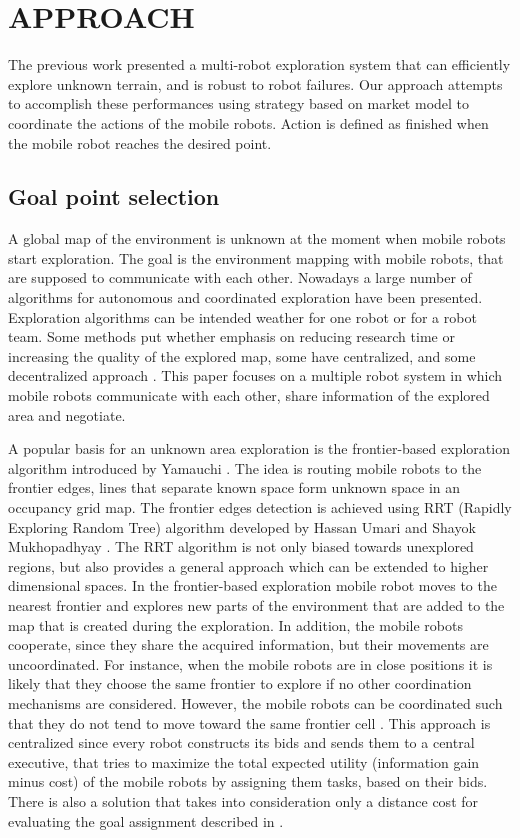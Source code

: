 \documentclass[letterpaper, 10 pt, conference]{ieeeconf}  %
\begin{document}
\section{APPROACH}
The previous work presented a multi-robot exploration system that can efficiently explore unknown terrain, and is robust to robot failures. Our approach attempts to accomplish these performances using strategy based on market model to coordinate the actions of the mobile robots. Action is defined as finished when the mobile robot reaches the desired point.  

\subsection{Goal point selection}
A global map of the environment is unknown at the moment when mobile robots start exploration. The goal is the environment mapping with mobile robots, that are supposed to communicate with each other. 
Nowadays a large number of algorithms for autonomous and coordinated exploration have been presented. Exploration algorithms can be intended weather for one robot or for a robot team. Some methods put whether emphasis on reducing research time or increasing the quality of the explored map, some have centralized, and some decentralized approach \cite{Julia}. This paper focuses on a multiple robot system in which mobile robots communicate with each other, share information of the explored area and negotiate. 

A popular basis for an unknown area exploration is the frontier-based exploration algorithm introduced by Yamauchi \cite{Yamauchi}. The idea is routing mobile robots to the frontier edges, lines that separate known space form unknown space in an occupancy grid map. The frontier edges detection is achieved using RRT (Rapidly Exploring Random Tree) algorithm developed by Hassan Umari and Shayok Mukhopadhyay \cite{Umari}. The RRT algorithm is not only biased towards unexplored regions, but also provides a general approach which can be extended to higher dimensional spaces.
In the frontier-based exploration mobile robot moves to the nearest frontier and explores new parts of the environment that are added to the map that is created during the exploration.
In addition, the mobile robots cooperate, since they share the acquired information, but their movements are uncoordinated. For instance, when the mobile robots are in close positions it is likely that they choose the same frontier to explore if no other coordination mechanisms are considered. However, the mobile robots can be coordinated such that they do not tend to move toward the same frontier cell \cite{burgard}. This approach is centralized since every robot constructs its bids and sends them to a central executive, that tries to maximize the total expected utility (information gain minus cost) of the mobile robots by assigning them tasks, based on their bids.  There is also a solution that takes into consideration only a distance cost for evaluating the goal assignment described in \cite{distance-cost}. 
\end{document}
